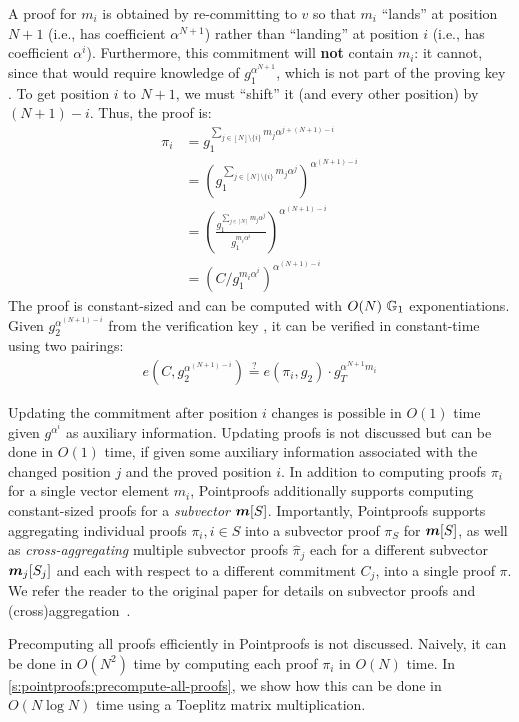 
A proof for $m_i$ is obtained by re-committing to $v$ so that $m_i$ ``lands'' at position $N+1$ (i.e., has coefficient $\alpha^{N+1}$) rather than ``landing'' at position $i$ (i.e., has coefficient $\alpha^i$).
Furthermore, this commitment will \textbf{not} contain $m_i$: it cannot, since that would require knowledge of $g_1^{\alpha^{N+1}}$, which is not part of the proving key \prk.
To get position $i$ to $N+1$, we must ``shift'' it (and every other position) by $(N + 1) - i$.
Thus, the proof is:
\begin{align}
    \label{eq:indiv-proof}
    \pi_i &= g_1^{\sum_{j\in[N]\setminus\{i\}} m_j \alpha^{j + (N+1) - i}}\\
    &= \left(g_1^{\sum_{j\in[N]\setminus\{i\}} m_j \alpha^{j}}\right)^{\alpha^{(N+1) - i}}\\
    &= \left(\frac{g_1^{\sum_{j\in[N]} m_j \alpha^{j}}}{g_1^{m_i \alpha^i}}\right)^{\alpha^{(N+1) - i}}\\
    &= (C / g_1^{m_i \alpha^i})^{\alpha^{(N+1) - i}}
\end{align}
The proof is constant-sized and can be computed with $O(N)\ \Gr_1$ exponentiations.
Given $g_2^{\alpha^{(N+1) - i}}$ from the verification key \vrk, it can be verified in constant-time using two pairings:
\begin{align}
    e(C, g_2^{\alpha^{(N+1)-i}}) \stackrel{?}{=} e(\pi_i, g_2) \cdot g_T^{\alpha^{N+1} m_i}
\end{align}

Updating the commitment after position $i$ changes is possible in $O(1)$ time given $g^{\alpha^i}$ as auxiliary information.
Updating proofs is not discussed but can be done in $O(1)$ time, if given some auxiliary information associated with the changed position $j$ and the proved position $i$.
In addition to computing proofs $\pi_i$ for a single vector element $m_i$, Pointproofs additionally supports computing constant-sized proofs for a \textit{subvector} $\bm{m}[S]$.
Importantly, Pointproofs supports aggregating individual proofs $\pi_i, i\in S$ into a subvector proof $\pi_S$ for $\bm{m}[S]$, as well as \textit{cross-aggregating} multiple subvector proofs $\hat{\pi}_j$ each for a different subvector $\bm{m}_j[S_j]$ and each with respect to a different commitment $C_j$, into a single proof $\pi$.
We refer the reader to the original paper for details on subvector proofs and (cross)aggregation~\cite{GRWZ20}.

Precomputing all proofs efficiently in Pointproofs is not discussed.
Naively, it can be done in $O(N^2)$ time by computing each proof $\pi_i$ in $O(N)$ time.
In \cref{s:pointproofs:precompute-all-proofs}, we show how this can be done in $O(N\log{N})$ time using a Toeplitz matrix multiplication.
